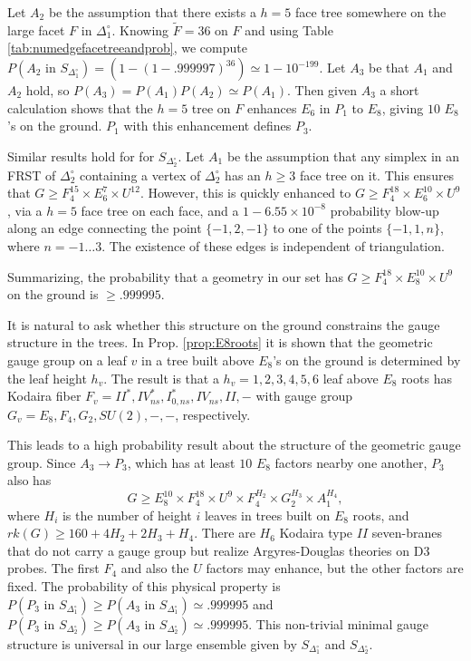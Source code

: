 \documentclass[aps,prl,twocolumn, superscriptaddress,groupedaddress,nofootinbib]{revtex4-1}
\newcommand{\sdoc}{S_{\Delta_1^\circ}}
\newcommand{\sdtc}{S_{\Delta_2^\circ}}
\newcommand{\doc}{{\Delta_1^\circ}}
\newcommand{\dtc}{{\Delta_2^\circ}}
\newcommand{\textin}{\,\, \text{in} \,\,}
\begin{document}
Let $A_2$ be the assumption that there exists a $h=5$ face tree somewhere
on the large facet $F$ in $\doc$. Knowing $\tilde F=36$ on $F$ and using
Table \ref{tab:numedgefacetreeandprob}, we compute $P(A_2 \textin \sdoc)=(1-(1-.999997)^{36})\simeq 1-10^{-199}.$ Let $A_3$ be that $A_1$ and $A_2$ hold, so 
$P(A_3)=P(A_1)P(A_2)\simeq P(A_1)$. Then given $A_3$ a short calculation shows 
that the  $h=5$ tree on $F$ 
enhances $E_6$ in $P_1$ to $E_8$, giving $10$ $E_8$'s on the ground. $P_1$ with this enhancement defines $P_3$. 

Similar results hold for for $\sdtc$. Let $A_1$ be the assumption that any simplex in an FRST 
of $\dtc$ containing a vertex of $\dtc$ has an $h\geq 3$ face tree on it. This ensures that $G\geq F_4^{15}\times E_6^{7}\times U^{12}$. However, this is quickly enhanced to  $G\geq F_4^{18}\times E_6^{10}\times U^9$, via a $h=5$ face tree on each face, and a $1-6.55\times 10^{-8}$ probability blow-up along an edge connecting the point $\{-1, 2, -1\}$ to one of the points $\{-1, 1, n\}$, where $n = -1\dots 3$. The existence of these edges is independent of triangulation.

Summarizing, the probability that a geometry in our set has
$G\geq F_4^{18}\times E_8^{10}\times U^9$ on the ground is $\geq .999995$.

It is natural to ask whether this structure on the ground constrains the gauge
structure in the trees. In Prop. \ref{prop:E8roots} it is shown that the 
geometric gauge group on a leaf $v$ in a tree built above $E_8$'s on the ground
is determined by the leaf height $h_v$. 
The result is that a $h_v=1,2,3,4,5,6$ leaf
above $E_8$ roots has Kodaira fiber $F_v=II^*,IV^*_{ns},I^*_{0,ns},IV_{ns},II,-$
with gauge group $G_v=E_8,F_4,G_2,SU(2),-,-$, respectively.

This leads to a high probability result about the structure of the geometric gauge group.
Since $A_3\to P_3$, which has at least $10$ $E_8$ factors nearby one another, $P_3$
also has
\begin{equation}
G\geq E_8^{10} \times F_4^{18}\times U^9 \times F_4^{H_2}\times G_2^{H_3}\times A_1^{H_4},
\end{equation}
where $H_i$ is the number of height $i$ leaves in trees built on $E_8$ roots,
and $rk(G)\geq 160+4H_2+2H_3+H_4$.
There are $H_6$ Kodaira type $II$ seven-branes that do not carry a gauge group but realize
Argyres-Douglas theories on D3 probes. The first $F_4$ and also
the $U$ factors may enhance, but the other factors are fixed. The probability
of this physical property is $P(P_3\textin \sdoc)\geq P(A_3\textin \sdoc) \simeq .999995$ and $P(P_3\textin \sdtc)\geq P(A_3\textin \sdtc) \simeq .999995$. This non-trivial minimal gauge structure is universal in our large ensemble given by $\sdoc$ and $\sdtc$.
\end{document}
